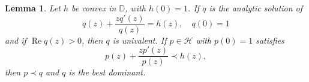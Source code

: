 \documentclass[a4paper,12pt]{amsart}
\newtheorem{lem}{Lemma}[section]
\theoremstyle{definition}
\begin{document}

\begin{lem}\label{T-28}\cite[Th.3.2i.]{miller-mocanu-2000} Let $ h $ be convex in $ \mathbb{D} $, with $ h(0) = 1 $. If $ q $ is the analytic solution of
$$
q(z) + \frac{zq'(z)}{q(z)} = h(z), \quad q(0) = 1
$$
and if $ \operatorname{Re} q(z) > 0 $, then $ q $ is univalent. If $ p \in \mathcal{H}$ with $p(0)=1$ satisfies
$$
p(z) + \frac{zp'(z)}{p(z)} \prec h(z),
$$
then $ p \prec q $ and $ q $ is the best dominant. 

\end{lem}
\end{document}

